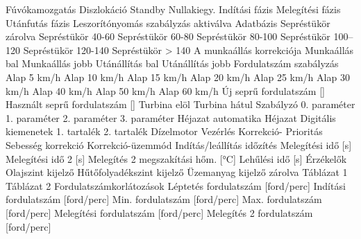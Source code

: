  {Fúvókamozgatás}
 {Diszlokáció}
 {Standby}
 {Nullakiegy.}
 {Indítási fázis}
 {Melegítési fázis}
 {Utánfutás fázis}
 {Leszorítónyomás szabályzás}
 {aktiválva}
 {Adatbázis}
 {Sepréstükör}
 {zárolva}
 {Sepréstükör  40-60}
 {Sepréstükör  60-80}
 {Sepréstükör  80-100}
 {Sepréstükör 100–120}
 {Sepréstükör 120-140}
 {Sepréstükör > 140}
 {A munkaállás korrekciója}
 {Munkaállás bal}
 {Munkaállás jobb}
 {Utánállítás bal}
 {Utánállítás jobb}
 {Fordulatszám szabályzás}
 {Alap  5 km/h}
 {Alap 10 km/h}
 {Alap 15 km/h}
 {Alap 20 km/h}
 {Alap 25 km/h}
 {Alap 30 km/h}
 {Alap 40 km/h}
 {Alap 50 km/h}
 {Alap 60 km/h}
 {Új seprű fordulatszám [\percent ]}
 {Használt seprű fordulatszám [\percent ]}
 {Turbina elöl}
 {Turbina hátul}
 {Szabályzó}
 {0. paraméter}
 {1. paraméter}
 {2. paraméter}
 {3. paraméter}
 {Héjazat automatika}
 {Héjazat}
 {Digitális kiemenetek}
 {1. tartalék}
 {2. tartalék}
 {Dízelmotor}
 {Vezérlés}
 {Korrekció- Prioritás}
 {Sebesség korrekció}
 {Korrekció-üzemmód}
 {Indítás/leállítás időzítés}
 {Melegítési idő [s]}
 {Melegítési idő 2 [s]}
 {Melegítés 2 megszakítási hőm. [°C]}
 {Lehűlési idő [s]}
 {Érzékelők}
 {Olajszint kijelző}
 {Hűtőfolyadékszint kijelző}
 {Üzemanyag kijelző}
 {zárolva}
 {Táblázat 1}
 {Táblázat 2}
 {Fordulatszámkorlátozások}
 {Léptetés fordulatszám [ford/perc]}
 {Indítási fordulatszám [ford/perc]}
 {Min. fordulatszám [ford/perc]}
 {Max. fordulatszám [ford/perc]}
 {Melegítési fordulatszám [ford/perc]}
 {Melegítés 2 fordulatszám [ford/perc]}
